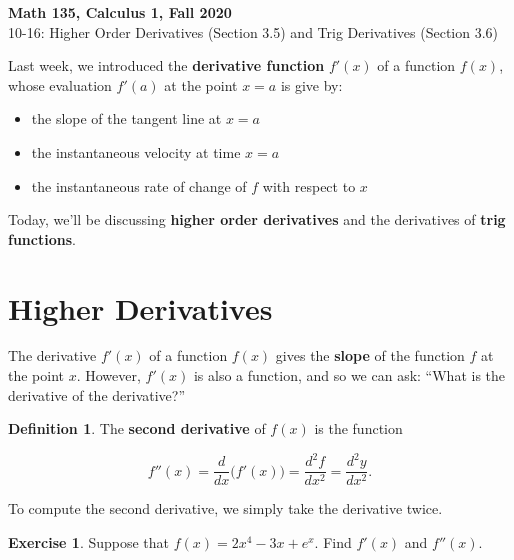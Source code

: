 \documentclass[11pt,reqno,final]{amsart}
\numberwithin{figure}{section}
\theoremstyle{definition} %
\newtheorem{definition}[equation]{Definition}%
\newtheorem{exercise}[question]{Exercise}
\begin{document}
\begin{center}
        \textbf{\Large Math 135, Calculus 1, Fall 2020}\\[10pt]
        {\large 10-16: Higher Order Derivatives (Section 3.5) and Trig Derivatives (Section 3.6)}
\end{center}

\thispagestyle{empty}


\renewcommand{\thesection}{\Alph{section}}


Last week, we introduced the \textbf{derivative function} $f'(x)$ of a function $f(x)$, whose evaluation $f'(a)$ at the point $x=a$ is give by:
\begin{itemize}
\item the slope of the tangent line at $x=a$
\item the instantaneous velocity at time $x = a$
\item the instantaneous rate of change of $f$ with respect to $x$
\end{itemize}

Today, we'll be discussing \textbf{higher order derivatives} and the derivatives of \textbf{trig functions}.

\section{Higher Derivatives}

The derivative $f'(x)$ of a function $f(x)$ gives the \textbf{slope} of the function $f$ at the point $x$.
However, $f'(x)$ is also a function, and so we can ask: ``What is the derivative of the derivative?''

\begin{definition}
        The \textbf{second derivative} of $f(x)$ is the function
        \begin{framed}
                \[
                        f''(x) = \dfrac{d}{dx}\big( f'(x) \big) = \dfrac{d^2f}{dx^2} = \dfrac{d^2y}{dx^2}.                
                \]
        \end{framed}
\end{definition}
To compute the second derivative, we simply take the derivative twice.

\begin{exercise}
        Suppose that $f(x) = 2x^4-3x+e^x$. Find $f'(x)$ and $f''(x)$.
        \vfill
\end{exercise}
\end{document}
